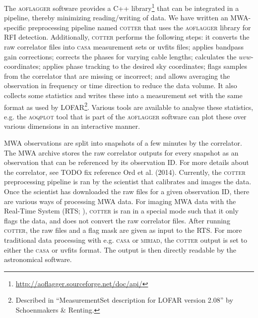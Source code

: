 \documentclass[useAMS,usenatbib]{mn2e}
\begin{document}
The \textsc{aoflagger} software provides a C++ library\footnote{\url{http://aoflagger.sourceforge.net/doc/api/}} that can be integrated in a pipeline, thereby minimizing reading/writing of data. We have written an MWA-specific preprocessing pipeline named \textsc{cotter} that uses the \textsc{aoflagger} library for RFI detection. Additionally, \textsc{cotter} performs the following steps: it converts the raw correlator files into \textsc{casa} measurement sets or uvfits files; applies bandpass gain corrections; corrects the phases for varying cable lengths; calculates the $uvw$-coordinates; applies phase tracking to the desired sky coordinates; flags samples from the correlator that are missing or incorrect; and allows averaging the observation in frequency or time direction to reduce the data volume. It also collects some statistics and writes these into a measurement set with the same format as used by LOFAR\footnote{Described in ``MeasurementSet description for LOFAR version 2.08'' by Schoenmakers \& Renting.}. Various tools are available to analyse these statistics, e.g. the \textsc{aoqplot} tool that is part of the \textsc{aoflagger} software can plot these over various dimensions in an interactive manner.

MWA observations are split into snapshots of a few minutes by the correlator. The MWA archive stores the raw correlator outputs for every snapshot as an observation that can be referenced by its observation ID. For more details about the correlator, see TODO fix reference Ord et al. (2014). Currently, the \textsc{cotter} preprocessing pipeline is ran by the scientist that calibrates and images the data. Once the scientist has downloaded the raw files for a given observation ID, there are various ways of processing MWA data. For imaging MWA data with the Real-Time System (RTS; \citealt{rts-mwa-2008}), \textsc{cotter} is ran in a special mode such that it only flags the data, and does not convert the raw correlator files. After running \textsc{cotter}, the raw files and a flag mask are given as input to the RTS. For more traditional data processing with e.g. \textsc{casa} or \textsc{miriad}, the \textsc{cotter} output is set to either the \textsc{casa} or uvfits format. The output is then directly readable by the astronomical software.
\end{document}
